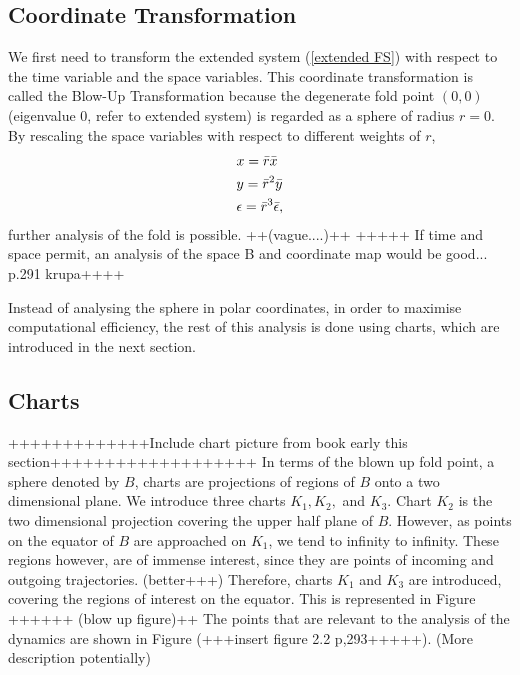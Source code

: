 \subsection{Coordinate Transformation}
We first need to transform the extended system (\ref{extended FS}) with respect to the time variable and the space variables. This coordinate transformation is called the Blow-Up Transformation because the degenerate fold point $(0,0)$ (eigenvalue 0, refer to extended system) is regarded as a sphere of radius $r=0$. By rescaling the space variables with respect to different weights of $r$,
\begin{subequations}
    \begin{align}
        &x=\Bar{r}\Bar{x}  \label{sys: blow up trans x}\\
        &y=\Bar{r}^2\Bar{y} \label{sys: blow up trans y}\\ 
        &\epsilon=\bar{r}^3\bar{\epsilon} \label{sys: blow up trans z},
    \end{align}  
    \label{sys: blow up trans}
\end{subequations}
further analysis of the fold is possible. ++(vague....)++
+++++ If time and space permit, an analysis of the space B and coordinate map would be good... p.291 krupa++++

Instead of analysing the sphere in polar coordinates, in order to maximise computational efficiency, the rest of this analysis is done using charts, which are introduced in the next section.

\subsection{Charts} +++++++++++++Include chart picture from book early this section+++++++++++++++++++
In terms of the blown up fold point, a sphere denoted by $B$, charts are projections of regions of $B$ onto a two dimensional plane. 
We introduce three charts $ K_1,K_2,$ and $K_3 $. Chart $K_2$ is the two dimensional projection covering the upper half plane of $B$. However, as points on the equator of $B$ are approached on $K_1$, we tend to infinity to infinity.
These regions however, are of immense interest, since they are points of incoming and outgoing trajectories. (better+++)
Therefore, charts $K_1$ and $K_3$ are introduced, covering the regions of interest on the equator. This is represented in Figure ++++++ (blow up figure)++
The points that are relevant to the analysis of the dynamics are shown in Figure (+++insert figure 2.2 p,293+++++). (More description potentially)

